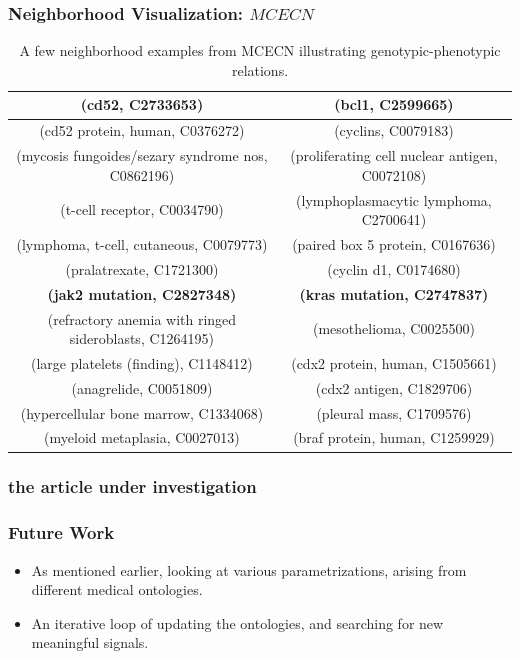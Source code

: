 \documentclass{beamer}
\newcommand\T{\rule{0pt}{2.6ex}}       %
\newcommand\B{\rule[-1.2ex]{0pt}{0pt}} %
\begin{document}
\begin{frame}
\frametitle{Neighborhood Visualization: $MCECN$}
\begin{table}[t]
\caption{\centering \scriptsize
 A few neighborhood
  examples from MCECN illustrating genotypic-phenotypic relations.\label{table:genotype-examples}}
{ \tiny
\begin{center}
\begin{tabular}{|c|c|} 
\hline
 {\bf (cd52, C2733653)} &  {\bf (bcl1, C2599665)} \T \B \\ 
\hline
(cd52 protein, human, C0376272) &  (cyclins, C0079183) \T \\
(mycosis fungoides/sezary syndrome nos, C0862196) &   (proliferating cell nuclear antigen, C0072108) \T \\
(t-cell receptor, C0034790) &  (lymphoplasmacytic lymphoma, C2700641) \T \\
 (lymphoma, t-cell, cutaneous, C0079773) & (paired box 5 protein, C0167636) \T \\
 (pralatrexate, C1721300) &   (cyclin d1, C0174680) \T \\
\hline
{\bf (jak2 mutation, C2827348)} & {\bf (kras mutation, C2747837) }  \T \B \\
\hline
 (refractory anemia with ringed sideroblasts, C1264195) & (mesothelioma, C0025500) \T \\
(large platelets (finding), C1148412) &  (cdx2 protein, human, C1505661) \T \\
 (anagrelide, C0051809) &  (cdx2 antigen, C1829706) \T \\
 (hypercellular bone marrow, C1334068)  & (pleural mass, C1709576) \T \\
 (myeloid metaplasia, C0027013) & (braf protein, human, C1259929) \T \\
\hline
\end{tabular}
\end{center}
}
\end{table}
\end{frame}

\begin{frame}
\frametitle{the article under investigation}
\end{frame}

\begin{frame}
\frametitle{Future Work}
\begin{itemize}
\item As mentioned earlier, looking at various 
parametrizations, arising from different
medical ontologies.

\bigskip

\item An iterative loop of updating the ontologies,
and searching for new meaningful signals. 

\end{itemize}
\end{frame}
\end{document}
